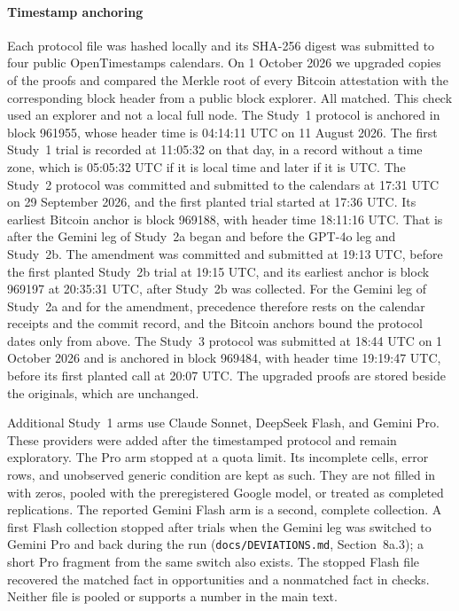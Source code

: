 \documentclass[final,5p,times,twocolumn]{elsarticle}
\begin{document}
\paragraph{Timestamp anchoring}
Each protocol file was hashed locally and its SHA-256 digest was submitted to
four public OpenTimestamps calendars. On 1 October 2026 we upgraded copies of
the proofs and compared the Merkle root of every Bitcoin attestation
with the corresponding block header from a public block explorer. All matched.
This check used an explorer and not a local full node. The Study~1 protocol is
anchored in block 961955, whose header time is 04:14:11 UTC on 11 August 2026.
The first Study~1 trial is recorded at 11:05:32 on that day, in a record
without a time zone, which is 05:05:32 UTC if it is local time and later if it
is UTC. The Study~2 protocol was committed and submitted to the calendars at
17:31 UTC on 29 September 2026, and the first planted trial started at 17:36
UTC. Its earliest Bitcoin anchor is block 969188, with header time 18:11:16
UTC. That is after the Gemini leg of Study~2a began and before the GPT-4o leg
and Study~2b. The amendment was committed and submitted at 19:13 UTC, before
the first planted Study~2b trial at 19:15 UTC, and its earliest anchor is block
969197 at 20:35:31 UTC, after Study~2b was collected. For the Gemini leg of
Study~2a and for the amendment, precedence therefore rests on the calendar
receipts and the commit record, and the Bitcoin anchors bound the protocol
dates only from above. The Study~3 protocol was submitted at 18:44 UTC on
1 October 2026 and is anchored in block 969484, with header time 19:19:47 UTC,
before its first planted call at 20:07 UTC. The upgraded proofs are stored
beside the originals, which are unchanged.

Additional Study~1 arms use Claude Sonnet, DeepSeek Flash, and Gemini Pro. These
providers were added after the timestamped protocol and remain exploratory.
The Pro arm stopped at a quota limit. Its incomplete cells, error rows, and
unobserved generic condition are kept as such. They are not filled in with
zeros, pooled with the preregistered Google model, or treated as completed
replications. The reported Gemini Flash arm is a second, complete collection.
A first Flash collection stopped after \DetVthreeAbandonedRows{} trials when
the Gemini leg was switched to Gemini Pro and back during the run
(\texttt{docs/DEVIATIONS.md}, Section~8a.3); a short Pro fragment from the same
switch also exists. The stopped Flash file recovered the matched fact in
\DetVthreeAbandonedMatched{} opportunities and a nonmatched fact in
\DetVthreeAbandonedNonmatched{} checks. Neither file is pooled or supports a
number in the main text.
\end{document}
